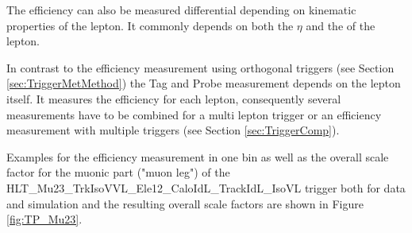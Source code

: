 The efficiency can also be measured differential depending on kinematic properties of the lepton. It commonly depends on both the $\eta$ and the \pt of the lepton. 

In contrast to the efficiency measurement using orthogonal triggers (see Section \ref{sec:TriggerMetMethod}) the Tag and Probe measurement depends on the lepton itself. It measures the efficiency for each lepton, consequently several measurements have to be combined for a multi lepton trigger or an efficiency measurement with multiple triggers (see Section \ref{sec:TriggerComp}). 

Examples for the efficiency measurement in one bin as well as the overall scale factor for the muonic part ("muon leg") of the HLT\_Mu23\_TrkIsoVVL\_Ele12\_CaloIdL\_TrackIdL\_IsoVL trigger both for data and simulation and the resulting overall scale factors are shown in Figure \ref{fig:TP_Mu23}.

